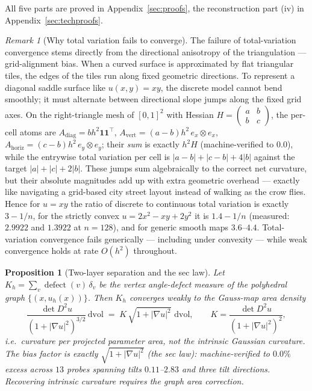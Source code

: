 \documentclass[11pt,a4paper]{article}
\theoremstyle{plain}
\newtheorem{proposition}[theorem]{Proposition}
\theoremstyle{definition}
\theoremstyle{remark}
\newtheorem{remark}[theorem]{Remark}
\newcommand{\dvol}{\,\mathrm{dvol}}
\begin{document}
All five parts are proved in Appendix~\ref{sec:proofs}, the
reconstruction part (iv) in Appendix~\ref{sec:techproofs}.

\begin{remark}[Why total variation fails to converge]\label{rem:tvcounter}
The failure of total-variation convergence stems directly from the
directional anisotropy of the triangulation --- grid-alignment bias.
When a curved surface is approximated by flat triangular tiles, the
edges of the tiles run along fixed geometric directions. To represent
a diagonal saddle surface like $u(x, y) = xy$, the discrete model
cannot bend smoothly; it must alternate between directional slope
jumps along the fixed grid axes. On the right-triangle mesh of $[0,1]^2$ with Hessian
$H = \left(\begin{smallmatrix} a & b\\ b & c\end{smallmatrix}\right)$, the
per-cell atoms are $A_{\mathrm{diag}} = b h^2 \mathbf{1}\mathbf{1}^\top$,
$A_{\mathrm{vert}} = (a-b) h^2\, e_x \otimes e_x$,
$A_{\mathrm{horiz}} = (c-b) h^2\, e_y \otimes e_y$; their \emph{sum} is
exactly $h^2 H$ (machine-verified to $0.0$), while the entrywise total
variation per cell is $|a-b| + |c-b| + 4|b|$ against the target
$|a| + |c| + 2|b|$. These jumps sum algebraically to the correct net
curvature, but their absolute magnitudes add up with extra geometric
overhead --- exactly like navigating a grid-based city street layout
instead of walking as the crow flies. Hence for $u = xy$ the ratio of
discrete to continuous total variation is exactly $3 - 1/n$, for
the strictly convex $u = 2x^2 - xy + 2y^2$ it is $1.4 - 1/n$ (measured:
$2.9922$ and $1.3922$ at $n=128$), and for generic smooth maps $3.6$--$4.4$.
Total-variation convergence fails generically --- including under
convexity --- while weak convergence holds at rate $O(h^2)$ throughout.
\end{remark}

\begin{proposition}[Two-layer separation and the sec law]
\label{prop:seclaw}
Let $K_h = \sum_v \operatorname{defect}(v)\,\delta_v$ be the vertex
angle-defect measure of the polyhedral graph
$\{(x, u_h(x))\}$. Then $K_h$ converges weakly to the \emph{Gauss-map area
density}
\[
\frac{\det D^2 u}{\left(1 + |\nabla u|^2\right)^{3/2}} \dvol
\;=\; K\,\sqrt{1+|\nabla u|^2}\,\dvol,
\qquad
K = \frac{\det D^2 u}{(1+|\nabla u|^2)^2},
\]
i.e.\ curvature per projected parameter area, \emph{not} the intrinsic
Gaussian curvature. The bias factor is exactly
$\sqrt{1+|\nabla u|^2}$ (the sec law): machine-verified to $0.0\%$ excess
across $13$ probes spanning tilts $0.11$--$2.83$ and three tilt
directions. Recovering intrinsic curvature requires the graph area
correction.
\end{proposition}
\end{document}
